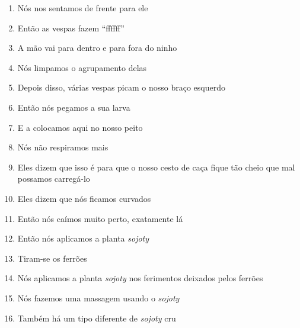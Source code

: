 \begin{enumerate}
 \item Nós nos sentamos de frente para ele

 \begin{center}\end{center}

 \item Então as vespas fazem ``ffffff''

 \item A mão vai para dentro e para fora do ninho

 \item Nós limpamos o agrupamento delas

 \item Depois disso, várias vespas picam o nosso braço esquerdo

 \item Então nós pegamos a sua larva

 \item E a colocamos aqui no nosso peito

 \item Nós não respiramos mais

 \begin{center}\end{center}

 \item Eles dizem que isso é para que o nosso cesto de caça fique tão cheio
 que mal possamos carregá-lo

 \item Eles dizem que nós ficamos curvados

 \item Então nós caímos muito perto, exatamente lá

 \begin{center}\end{center}

 \item Então nós aplicamos a planta \textit{sojoty}

 \item Tiram-se os ferrões

 \item Nós aplicamos a planta \textit{sojoty} nos ferimentos deixados pelos
 ferrões

 \item Nós fazemos uma massagem usando o \textit{sojoty}

 \item Também há um tipo diferente de \textit{sojoty} cru


\end{enumerate}
